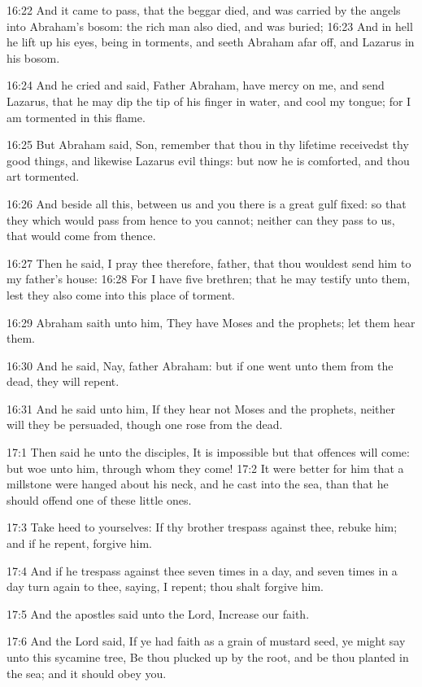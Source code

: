 16:22 And it came to pass, that the beggar died, and was carried by the angels into Abraham's bosom: the rich man also died, and was buried; 16:23 And in hell he lift up his eyes, being in torments, and seeth Abraham afar off, and Lazarus in his bosom.

16:24 And he cried and said, Father Abraham, have mercy on me, and send Lazarus, that he may dip the tip of his finger in water, and cool my tongue; for I am tormented in this flame.

16:25 But Abraham said, Son, remember that thou in thy lifetime receivedst thy good things, and likewise Lazarus evil things: but now he is comforted, and thou art tormented.

16:26 And beside all this, between us and you there is a great gulf fixed: so that they which would pass from hence to you cannot; neither can they pass to us, that would come from thence.

16:27 Then he said, I pray thee therefore, father, that thou wouldest send him to my father's house: 16:28 For I have five brethren; that he may testify unto them, lest they also come into this place of torment.

16:29 Abraham saith unto him, They have Moses and the prophets; let them hear them.

16:30 And he said, Nay, father Abraham: but if one went unto them from the dead, they will repent.

16:31 And he said unto him, If they hear not Moses and the prophets, neither will they be persuaded, though one rose from the dead.

17:1 Then said he unto the disciples, It is impossible but that offences will come: but woe unto him, through whom they come!  17:2 It were better for him that a millstone were hanged about his neck, and he cast into the sea, than that he should offend one of these little ones.

17:3 Take heed to yourselves: If thy brother trespass against thee, rebuke him; and if he repent, forgive him.

17:4 And if he trespass against thee seven times in a day, and seven times in a day turn again to thee, saying, I repent; thou shalt forgive him.

17:5 And the apostles said unto the Lord, Increase our faith.

17:6 And the Lord said, If ye had faith as a grain of mustard seed, ye might say unto this sycamine tree, Be thou plucked up by the root, and be thou planted in the sea; and it should obey you.

